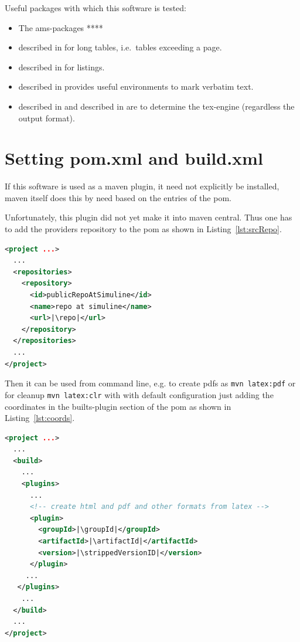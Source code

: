\documentclass[12pt]{book}
\begin{document}
\noindent
Useful packages with which this software is tested: 
%
\begin{itemize}
\item
The ams-packages **** 
\item
{} described in \cite{LongTabP} 
for long tables, i.e.~tables exceeding a page. 
\item
{} described in \cite{ListingsP} for listings. 
\item
{} described in \cite{FancyVerbP} 
provides useful environments to mark verbatim text. 
\item
{} described in \cite{IfXeTeXP} and 
 described in \cite{IfLuaTeXP} 
are to determine the tex-engine (regardless the output format). 

\end{itemize}


\section{Setting pom.xml and build.xml}\label{sec:sgml}

If this software is used as a maven plugin,
it need not explicitly be installed, maven itself does this by need
based on the entries of the pom.

Unfortunately, this plugin did not yet make it into maven central.
Thus one has to add the providers repository to the pom
as shown in Listing~\ref{lst:srcRepo}. 

\begin{lstlisting}[language=xml, basicstyle=\footnotesize,
escapechar=|,
float, captionpos=b, label={lst:srcRepo}, 
caption={The source repository for this plugin}]
<project ...>
  ...
  <repositories>
    <repository>
      <id>publicRepoAtSimuline</id>
      <name>repo at simuline</name>
      <url>|\repo|</url>
    </repository>
  </repositories>
  ...
</project>
\end{lstlisting}

Then it can be used from command line,
e.g. to create pdfs as \texttt{mvn latex:pdf}
or for cleanup \texttt{mvn latex:clr} with with default configuration
just adding the coordinates in the builts-plugin section of the pom
as shown in Listing~\ref{lst:coords}. 
%
\begin{lstlisting}[language=xml, basicstyle=\footnotesize,
escapechar=|,
float, captionpos=b, label={lst:coords}, 
caption={The coordinates of this plugin}]
<project ...>
  ...
  <build>
    ...
    <plugins>
      ...
      <!-- create html and pdf and other formats from latex -->
      <plugin>
        <groupId>|\groupId|</groupId>
        <artifactId>|\artifactId|</artifactId>
        <version>|\strippedVersionID|</version>
      </plugin>
     ...
   </plugins>
    ...
  </build>
  ...
</project>
\end{lstlisting}
\end{document}
